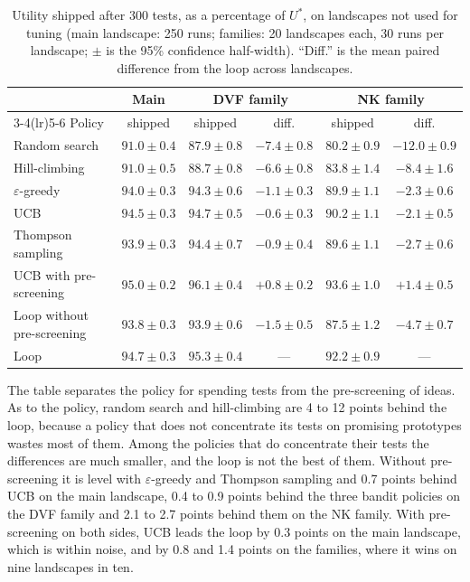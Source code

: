 \documentclass[10pt,twocolumn]{article}
\theoremstyle{definition}
\begin{document}
\begin{table}[t]
\caption{Utility shipped after 300 tests, as a percentage of $U^*$, on landscapes not used for tuning (main landscape: 250 runs; families: 20 landscapes each, 30 runs per landscape; $\pm$ is the 95\% confidence half-width). ``Diff.'' is the mean paired difference from the loop across landscapes.}
\label{tab:baselines}
\centering\small
\begin{tabular}{@{}lccccc@{}}
\toprule
& Main & \multicolumn{2}{c}{DVF family} & \multicolumn{2}{c}{NK family}\\
\cmidrule(lr){3-4}\cmidrule(lr){5-6}
Policy & shipped & shipped & diff. & shipped & diff.\\
\midrule
Random search & $91.0\pm0.4$ & $87.9\pm0.8$ & $-7.4\pm0.8$ & $80.2\pm0.9$ & $-12.0\pm0.9$\\
Hill-climbing & $91.0\pm0.5$ & $88.7\pm0.8$ & $-6.6\pm0.8$ & $83.8\pm1.4$ & $-8.4\pm1.6$\\
$\varepsilon$-greedy & $94.0\pm0.3$ & $94.3\pm0.6$ & $-1.1\pm0.3$ & $89.9\pm1.1$ & $-2.3\pm0.6$\\
UCB & $94.5\pm0.3$ & $94.7\pm0.5$ & $-0.6\pm0.3$ & $90.2\pm1.1$ & $-2.1\pm0.5$\\
Thompson sampling & $93.9\pm0.3$ & $94.4\pm0.7$ & $-0.9\pm0.4$ & $89.6\pm1.1$ & $-2.7\pm0.6$\\
\addlinespace[2pt]
UCB with pre-screening & $95.0\pm0.2$ & $96.1\pm0.4$ & $+0.8\pm0.2$ & $93.6\pm1.0$ & $+1.4\pm0.5$\\
Loop without pre-screening & $93.8\pm0.3$ & $93.9\pm0.6$ & $-1.5\pm0.5$ & $87.5\pm1.2$ & $-4.7\pm0.7$\\
Loop & $94.7\pm0.3$ & $95.3\pm0.4$ & --- & $92.2\pm0.9$ & ---\\
\bottomrule
\end{tabular}
\end{table}

The table separates the policy for spending tests from the pre-screening of ideas. As to the policy, random search and hill-climbing are 4 to 12 points behind the loop, because a policy that does not concentrate its tests on promising prototypes wastes most of them. Among the policies that do concentrate their tests the differences are much smaller, and the loop is not the best of them. Without pre-screening it is level with $\varepsilon$-greedy and Thompson sampling and 0.7 points behind UCB on the main landscape, 0.4 to 0.9 points behind the three bandit policies on the DVF family and 2.1 to 2.7 points behind them on the NK family. With pre-screening on both sides, UCB leads the loop by 0.3 points on the main landscape, which is within noise, and by 0.8 and 1.4 points on the families, where it wins on nine landscapes in ten.
\end{document}
